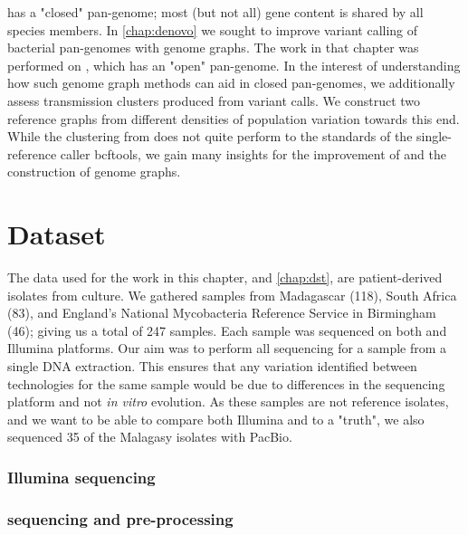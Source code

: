 \mtb{} has a "closed" pan-genome; most (but not all) gene content is shared by all species members. In \autoref{chap:denovo} we sought to improve variant calling of bacterial pan-genomes with genome graphs. The work in that chapter was performed on \ecoli{}, which has an "open" pan-genome. In the interest of understanding how such genome graph methods can aid in closed pan-genomes, we additionally assess transmission clusters produced from \pandora{} variant calls. We construct two \mtb{} reference graphs from different densities of population variation towards this end. While the clustering from \pandora{} does not quite perform to the standards of the single-reference caller bcftools, we gain many insights for the improvement of \pandora{} and the construction of genome graphs.


\section{Dataset}
\label{sec:dataset}

The data used for the work in this chapter, and \autoref{chap:dst}, are patient-derived \mtb{} isolates from culture. We gathered samples from Madagascar (118), South Africa (83), and England's National Mycobacteria Reference Service in Birmingham (46); giving us a total of 247 samples.  
Each sample was sequenced on both \ont{} and Illumina platforms. Our aim was to perform all sequencing for a sample from a single DNA extraction. This ensures that any variation identified between technologies for the same sample would be due to differences in the sequencing platform and not \textit{in vitro} evolution.  
As these samples are not reference isolates, and we want to be able to compare both Illumina and \ont{} to a "truth", we also sequenced 35 of the Malagasy isolates with PacBio.

\subsubsection{Illumina sequencing}


\subsubsection{\ont{} sequencing and pre-processing}

